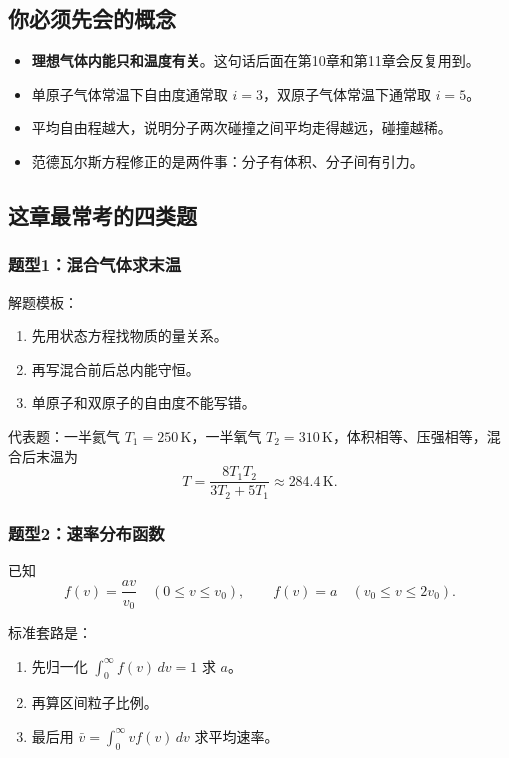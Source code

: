 \documentclass[12pt,a4paper]{article}
\newcommand{\key}[1]{\textcolor{blue!60!black}{\textbf{#1}}}
\begin{document}
\subsection{你必须先会的概念}

\begin{itemize}
  \item \key{理想气体内能只和温度有关}。这句话后面在第10章和第11章会反复用到。
  \item 单原子气体常温下自由度通常取 $i=3$，双原子气体常温下通常取 $i=5$。
  \item 平均自由程越大，说明分子两次碰撞之间平均走得越远，碰撞越稀。
  \item 范德瓦尔斯方程修正的是两件事：分子有体积、分子间有引力。
\end{itemize}

\subsection{这章最常考的四类题}

\subsubsection*{题型1：混合气体求末温}

解题模板：

\begin{enumerate}
  \item 先用状态方程找物质的量关系。
  \item 再写混合前后总内能守恒。
  \item 单原子和双原子的自由度不能写错。
\end{enumerate}

代表题：一半氦气 $T_1=250\,\mathrm{K}$，一半氧气 $T_2=310\,\mathrm{K}$，体积相等、压强相等，混合后末温为
\[
T=\frac{8T_1T_2}{3T_2+5T_1}\approx 284.4\,\mathrm{K}.
\]

\subsubsection*{题型2：速率分布函数}

已知
\[
f(v)=\frac{av}{v_0}\quad (0\le v\le v_0),\qquad
f(v)=a\quad (v_0\le v\le 2v_0).
\]

标准套路是：

\begin{enumerate}
  \item 先归一化 $\int_0^\infty f(v)\,dv=1$ 求 $a$。
  \item 再算区间粒子比例。
  \item 最后用 $\bar v=\int_0^\infty vf(v)\,dv$ 求平均速率。
\end{enumerate}
\end{document}
